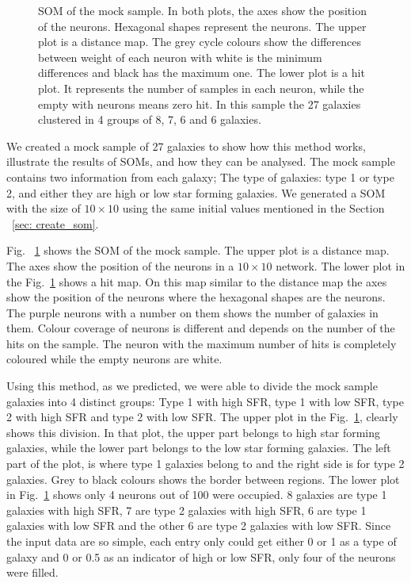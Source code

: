 \begin{figure}
\begin{subfigure}[b]{0.5\textwidth}
            \end{subfigure}
            \caption{SOM of the mock sample. In both plots, the axes show the position of the neurons. Hexagonal shapes represent the neurons. The upper plot is a distance map. The grey cycle colours show the differences between weight of each neuron with white is the minimum differences and black has the maximum one. The lower plot is a hit plot. It represents the number of samples in each neuron, while the empty with neurons means zero hit. In this sample the 27 galaxies clustered in 4 groups of 8, 7, 6 and 6 galaxies.}
            \label{fig: sample}
        \end{figure}
 
 We created  a mock sample of 27 galaxies to show how this method works, illustrate the results of SOMs, and how they can be analysed.
 The mock sample contains two information from each galaxy; The type of galaxies: type 1 or type 2, and either they are high or low star forming galaxies. 
 We generated a SOM with the size of $10 \times 10$ using the same initial values mentioned in the Section ~\ref{sec: create_som}.

 Fig. ~\ref{fig: sample} shows the SOM of the mock sample. 
 The upper plot is a distance map. 
 The axes show the position of the neurons in a $10 \times 10$ network.
 The lower plot in the Fig.~\ref{fig: sample} shows a hit map.
 On this map similar to the distance map the axes show the position of the neurons where the hexagonal shapes are the neurons.
 The purple neurons with a number on them shows the number of galaxies in them.
 Colour coverage of neurons is different and depends on the number of the hits on the sample.
 The neuron with the maximum number of hits is completely coloured while the empty neurons are white.
 
Using this method, as we predicted, we were able to divide the mock sample galaxies into 4 distinct groups: Type 1 with high SFR, type 1 with low SFR, type 2 with high SFR and type 2 with low SFR. 
The upper plot in the Fig.~\ref{fig: sample}, clearly shows this division.
In that plot, the upper part belongs to high star forming galaxies, while the lower part belongs to the low star forming galaxies.
The left part of the plot, is where type 1 galaxies belong to and the right side is for type 2 galaxies.
Grey to black colours shows the border between regions.
The lower plot in Fig.~\ref{fig: sample} shows only 4 neurons out of 100 were occupied. 
8 galaxies are type 1 galaxies with high SFR, 7 are type 2 galaxies with high SFR, 6 are type 1 galaxies with low SFR and the other 6 are type 2 galaxies with low SFR. 
Since the input data are so simple, each entry only could get either 0 or 1 as a type of galaxy and 0 or 0.5 as an indicator of  high or low SFR, only four of the neurons were filled.

